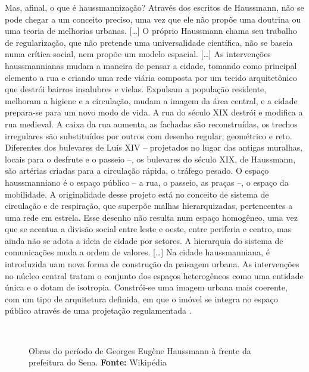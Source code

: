 \begin{citacao}
Mas, afinal, o que é haussmannização? Através dos escritos de Haussmann, não se pode chegar a um conceito preciso, uma vez que ele não propõe uma doutrina ou uma teoria de melhorias urbanas.
[\dots] O próprio Haussmann chama seu trabalho de regularização, que não pretende uma universalidade científica, não se baseia numa crítica social, nem propõe um modelo espacial.
[\dots] As intervenções haussmannianas mudam a maneira de pensar a cidade, tomando como principal elemento a rua e criando uma rede viária composta por um tecido arquitetônico que destrói bairros insalubres e vielas. Expulsam a população residente, melhoram a higiene e a circulação, mudam a imagem da área central, e a cidade prepara-se para um novo modo de vida. A rua do século XIX destrói e modifica a rua medieval. A caixa da rua aumenta, as fachadas são reconstruídas, os trechos irregulares são substituídos por outros com desenho regular, geométrico e reto. Diferentes dos bulevares de Luís XIV -- projetados no lugar das antigas muralhas, locais para o desfrute e o passeio --, os bulevares do século XIX, de Haussmann, são artérias criadas para a circulação rápida, o tráfego pesado. O espaço haussmanniano é o espaço público -- a rua, o passeio, as praças --, o espaço da mobilidade. A originalidade desse projeto está no conceito de sistema de circulação e de respiração, que superpõe malhas hierarquizadas, pertencentes a uma rede em estrela. Esse desenho não resulta num espaço homogêneo, uma vez que se acentua a divisão social entre leste e oeste, entre periferia e centro, mas ainda não se adota a ideia de cidade por setores. A hierarquia do sistema de comunicações muda a ordem de valores.
[\dots] Na cidade haussmanniana, é introduzida uam nova forma de construção da paisagem urbana. As intervenções no núcleo central tratam o conjunto dos espaços heterogêneos como uma entidade única e o dotam de isotropia. Constrói-se uma imagem urbana mais coerente, com um tipo de arquitetura definida, em que o imóvel se integra no espaço público através de uma projetação regulamentada \cite[pp.~68,~77]{petti_eurfranba_2011}.
\end{citacao}

\begin{figure}[!htp]
\centering
{}
\  %
\caption{Obras do período de Georges Eugène Haussmann à frente da prefeitura do Sena. \textbf{Fonte:} Wikipédia}
\end{figure}


